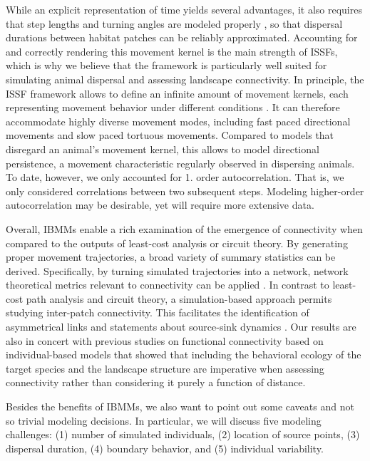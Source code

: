 \documentclass[abstract=on,10pt,a4paper,bibliography=totocnumbered]{article}
\begin{document}
While an explicit representation of time yields several advantages, it also
requires that step lengths and turning angles are modeled properly
\citep{Kanagaraj.2013}, so that dispersal durations between habitat patches can
be reliably approximated. Accounting for and correctly rendering this movement
kernel is the main strength of ISSFs, which is why we believe that the framework
is particularly well suited for simulating animal dispersal and assessing
landscape connectivity. In principle, the ISSF framework allows to define an
infinite amount of movement kernels, each representing movement behavior under
different conditions \citep{Fieberg.2020}. It can therefore accommodate highly
diverse movement modes, including fast paced directional movements and slow
paced tortuous movements. Compared to models that disregard an animal's movement
kernel, this allows to model directional persistence, a movement characteristic
regularly observed in dispersing animals. To date, however, we only accounted
for 1. order autocorrelation. That is, we only considered correlations between
two subsequent steps. Modeling higher-order autocorrelation may be desirable,
yet will require more extensive data.

Overall, IBMMs enable a rich examination of the emergence of connectivity when
compared to the outputs of least-cost analysis or circuit theory. By generating
proper movement trajectories, a broad variety of summary statistics can be
derived. Specifically, by turning simulated trajectories into a network, network
theoretical metrics relevant to connectivity can be applied
\citep{BastilleRousseau.2018}. In contrast to least-cost path analysis and
circuit theory, a simulation-based approach permits studying inter-patch
connectivity. This facilitates the identification of asymmetrical links and
statements about source-sink dynamics \citep{Ferreras.2001, Revilla.2004,
Kanagaraj.2013}. Our results are also in concert with previous studies on
functional connectivity based on individual-based models that showed that
including the behavioral ecology of the target species and the landscape
structure are imperative when assessing connectivity \citep{Gustafson.1996,
Gardner.2004, Graf.2007, KramerSchadt.2004, Revilla.2004, Revilla.2008,
Kanagaraj.2013} rather than considering it purely a function of distance.

Besides the benefits of IBMMs, we also want to point out some caveats and not so
trivial modeling decisions. In particular, we will discuss five modeling
challenges: (1) number of simulated individuals, (2) location of source points,
(3) dispersal duration, (4) boundary behavior, and (5) individual variability.
\end{document}
